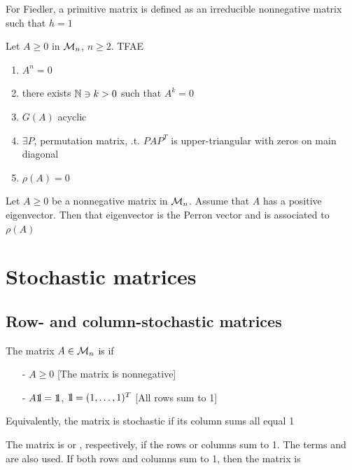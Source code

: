 \documentclass[aspectratio=169]{beamer}
\begin{document}
\begin{frame}
\begin{remark}
For Fiedler, a primitive matrix is defined as an irreducible nonnegative matrix such that $h=1$
\end{remark}
\end{frame}


\begin{frame}
\begin{theorem}
Let $A\geq 0$ in $\mathcal{M}_n$, $n \geq 2$. TFAE
\begin{enumerate}
    \item $A^n=0$
    \item there exists $\mathbb{N}\ni k>0$ such that $A^k=0$
    \item $G(A)$ acyclic
    \item $\exists P$, permutation matrix, .t. $PAP^T$ is upper-triangular with zeros on main diagonal
    \item $\rho(A)=0$
\end{enumerate}
\end{theorem}
\vfill
\begin{theorem}
Let $A\geq 0$ be a nonnegative matrix in $\mathcal{M}_n$. Assume that $A$ has a positive eigenvector. Then that eigenvector is the Perron vector and is associated to $\rho(A)$
\end{theorem}
\end{frame}


\section{Stochastic matrices}

\subsection{Row- and column-stochastic matrices}\label{sec:rowStochastic_matrices}


\begin{frame}
\begin{definition}
The matrix $A\in \mathcal{M}_n$ is  if
\begin{enumerate}
    \item[-] $A\geq 0$ \hfill[The matrix is nonnegative]
    \item[-] $A\nbOne = \nbOne$,  $\nbOne=(1,\ldots,1)^T$ \hfill[All rows sum to 1]
\end{enumerate}
\end{definition}
\vfill
Equivalently, the matrix is stochastic if its column sums all equal 1
\vfill
\begin{definition}
  The matrix is  or , respectively, if the rows or columns sum to 1. The terms  and  are also used. If both rows and columns sum to 1, then the matrix is 
\end{definition}
\end{frame}
\end{document}
